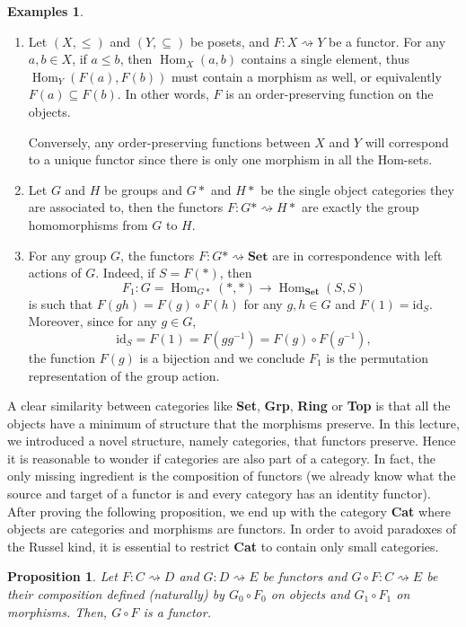 \documentclass{article}
\newtheorem{prop}[thm]{Proposition}
\theoremstyle{definition}
\newtheorem{exmps}[thm]{Examples}
\theoremstyle{remark}
\DeclareMathOperator{\Hom}{Hom}
\newcommand{\id}{\text{id}}
\begin{document}
\begin{exmps}
\begin{enumerate}
		\item Let $(X, \leq)$ and $(Y, \subseteq)$ be posets, and $F:X\rightsquigarrow Y$ be a functor. For any $a, b \in X$, if $a\leq b$, then $\Hom_X(a,b)$ contains a single element, thus $\Hom_Y(F(a), F(b))$ must contain a morphism as well, or equivalently $F(a) \subseteq F(b)$. In other words, $F$ is an order-preserving function on the objects.
		
		Conversely, any order-preserving functions between $X$ and $Y$ will correspond to a unique functor since there is only one morphism in all the Hom-sets.
				
		\item Let $G$ and $H$ be groups and $G\ast$ and $H\ast$ be the single object categories they are associated to, then the functors $F: G\ast \rightsquigarrow H\ast$ are exactly the group homomorphisms from $G$ to $H$.
		
		\item For any group $G$, the functors $F:G\ast \rightsquigarrow \textbf{Set}$ are in correspondence with left actions of $G$. Indeed, if $S = F(\ast)$, then \[F_1: G = \Hom_{G\ast}(\ast, \ast) \rightarrow \Hom_{\textbf{Set}}(S, S)\]
		is such that $F(gh) = F(g) \circ F(h)$ for any $g,h \in G$ and $F(1) = \id_S$. Moreover, since for any $g \in G$,
		\[\id_S = F(1) = F(gg^{-1}) = F(g) \circ F(g^{-1}),\]
		the function $F(g)$ is a bijection and we conclude $F_1$ is the permutation representation of the group action.
	\end{enumerate}
\end{exmps}
A clear similarity between categories like \textbf{Set}, \textbf{Grp}, \textbf{Ring} or \textbf{Top} is that all the objects have a minimum of structure that the morphisms preserve. In this lecture, we introduced a novel structure, namely categories, that functors preserve. Hence it is reasonable to wonder if categories are also part of a category. In fact, the only missing ingredient is the composition of functors (we already know what the source and target of a functor is and every category has an identity functor). After proving the following proposition, we end up with the category \textbf{Cat} where objects are categories and morphisms are functors. In order to avoid paradoxes of the Russel kind, it is essential to restrict \textbf{Cat} to contain only small categories.
\begin{prop}
	Let $F:C\rightsquigarrow D$ and $G: D\rightsquigarrow E$ be functors and $G \circ F:C \rightsquigarrow E$ be their composition defined (naturally) by $G_0 \circ F_0$ on objects and $G_1 \circ F_1$ on morphisms. Then, $G \circ F$ is a functor.
\end{prop}
\end{document}
